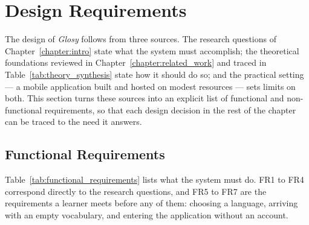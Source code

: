 \raggedbottom
\section{Design Requirements}
\label{sec:design_requirements}
    The design of \textit{Glosy} follows from three sources. The research questions of Chapter~\ref{chapter:intro} state what the system must accomplish; the theoretical foundations reviewed in Chapter~\ref{chapter:related_work} and traced in Table~\ref{tab:theory_synthesis} state how it should do so; and the practical setting --- a mobile application built and hosted on modest resources --- sets limits on both. This section turns these sources into an explicit list of functional and non-functional requirements, so that each design decision in the rest of the chapter can be traced to the need it answers.

    \subsection{Functional Requirements}
    Table~\ref{tab:functional_requirements} lists what the system must do. FR1 to FR4 correspond directly to the research questions, and FR5 to FR7 are the requirements a learner meets before any of them: choosing a language, arriving with an empty vocabulary, and entering the application without an account.


